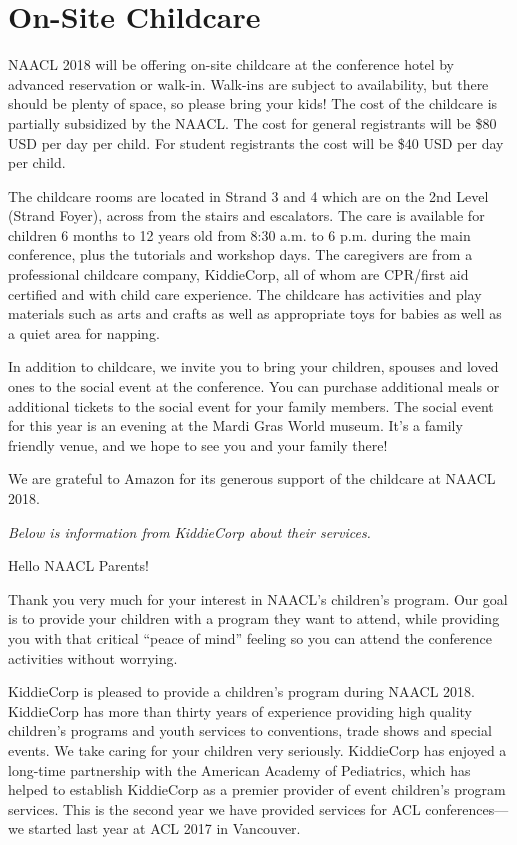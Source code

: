 \chapter{On-Site Childcare}

NAACL 2018 will be offering on-site childcare at the conference hotel by advanced reservation or walk-in.   Walk-ins are subject to availability, but there should be plenty of space, so please bring your kids!  The cost of the childcare is partially subsidized by the NAACL. The cost for general registrants will be \$80 USD per day per child. For student registrants the cost will be \$40 USD per day per child.

The childcare rooms are located in Strand 3 and 4 which are on the 2nd Level (Strand Foyer), across from the stairs and escalators. 
The care is available for children 6 months to 12 years old from 8:30 a.m. to 6 p.m. during the main conference, plus the tutorials and workshop days. The caregivers are from a professional childcare company, KiddieCorp, all of whom are CPR/first aid certified and with child care experience. The childcare has activities and play materials such as arts and crafts as well as appropriate toys for babies as well as a quiet area for napping.  

In addition to childcare, we invite you to bring your children, spouses and loved ones to the social event at the conference. You can purchase additional meals or additional tickets to the social event for your family members. The social event for this year is an evening at the Mardi Gras World museum. It's a family friendly venue, and we hope to see you and your family there!


We are grateful to Amazon for its generous support of the childcare at NAACL 2018.


\emph{Below is information from KiddieCorp about their services.}


Hello NAACL Parents!

Thank you very much for your interest in NAACL's children's program.
Our goal is to provide your children with a program they want to attend,
while providing you with that critical ``peace of mind'' feeling so you can
attend the conference activities without worrying.

KiddieCorp is pleased to provide a children's program during NAACL 2018.
KiddieCorp has more than thirty years of experience providing high quality
children's programs and youth services to conventions, trade shows and
special events. We take caring for your children very seriously. KiddieCorp
has enjoyed a long-time partnership with the American Academy of Pediatrics,
which has helped to establish KiddieCorp as a premier provider of event
children's program services.  This is the second year we have provided
services for ACL conferences---we started last year at ACL 2017 in
Vancouver. 



